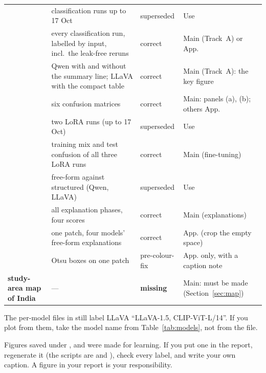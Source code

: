 \begin{longtable}{L{4.0cm}L{4.6cm}L{2.0cm}L{3.4cm}}
 & classification runs up to 17 Oct & superseded & Use  \\
 & every classification run, labelled by input, incl.\ the leak-free reruns & correct & Main (Track~A) or App. \\
 & Qwen with and without the summary line; LLaVA with the compact table & correct & Main (Track~A): the key figure \\
 & six confusion matrices & correct & Main: panels (a), (b); others App. \\
 & two LoRA runs (up to 17 Oct) & superseded & Use  \\
 & training mix and test confusion of all three LoRA runs & correct & Main (fine-tuning) \\
 & free-form against structured (Qwen, LLaVA) & superseded & Use  \\
 & all explanation phases, four scores & correct & Main (explanations) \\
 & one patch, four models' free-form explanations & correct & App. (crop the empty space) \\
 & Otsu boxes on one patch & pre-colour-fix & App. only, with a caption note \\
\textbf{study-area map of India} & --- & \textbf{missing} & Main: must be made (Section~\ref{sec:map}) \\
\bottomrule
\end{longtable}

\begin{watchout}
The per-model files in  still label LLaVA ``LLaVA-1.5, CLIP-ViT-L/14''. If you plot from them, take the model name from Table~\ref{tab:models}, not from the file.

Figures saved under ,  and  were made for learning. If you put one in the report, regenerate it (the scripts are  and ), check every label, and write your own caption. A figure in your report is your responsibility.
\end{watchout}

